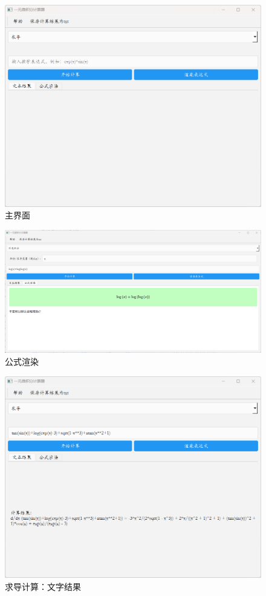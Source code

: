 \documentclass[UTF8,12pt]{ctexart}
\begin{document}
	\begin{figure}[H]
		\centering
		\includegraphics[width=1.0\linewidth]{主界面}
		\caption{主界面}
		\label{fig:mainwindow}
	\end{figure}
	\begin{figure}[H]
		\centering
		\includegraphics[width=1.0\linewidth]{渲染表达式}
		\caption{公式渲染}
		\label{fig:latex}
	\end{figure}
	\begin{figure}[H]
		\centering
		\includegraphics[width=1.0\linewidth]{求导计算_文字结果}
		\caption{求导计算：文字结果}
		\label{fig:dif_text}
	\end{figure}
\end{document}

